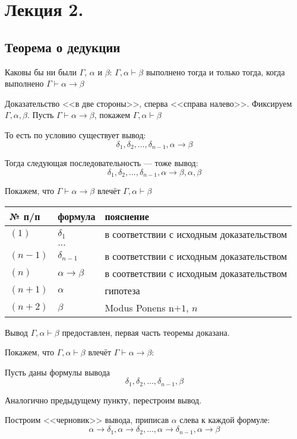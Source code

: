\section{Лекция 2.}

\subsection{Теорема о дедукции}
Каковы бы ни были $\Gamma$, $\alpha$ и $\beta$:
$\Gamma,\alpha\vdash\beta$ выполнено тогда и только тогда, когда выполнено $\Gamma\vdash\alpha\rightarrow\beta$


Доказательство <<в две стороны>>, сперва <<справа налево>>.
Фиксируем $\Gamma,\alpha,\beta$.
Пусть $\Gamma\vdash\alpha\rightarrow\beta$, покажем $\Gamma,\alpha\vdash\beta$

То есть по условию существует вывод: $$\delta_1, \delta_2, \dots, \delta_{n-1}, \alpha\rightarrow\beta$$

Тогда следующая последовательность --- тоже вывод: 
$$\delta_1, \delta_2, \dots, \delta_{n-1}, \alpha\rightarrow\beta, \alpha, \beta$$


Покажем, что $\Gamma\vdash\alpha\rightarrow\beta$ влечёт $\Gamma,\alpha\vdash\beta$

\begin{tabular}{lll}
№ п/п & формула & пояснение\\
\hline
$(1)$ & $\delta_1$ & в соответствии с исходным доказательством\\
    & $\dots$ \\
$(n-1)$ & $\delta_{n-1}$ & в соответствии с исходным доказательством\\
$(n)$ & $\alpha\rightarrow\beta $ & в соответствии с исходным доказательством\\
$(n+1)$ & $\alpha$ & гипотеза\\
$(n+2)$ & $\beta$ & Modus Ponens n$+1$, $n$
\end{tabular}

Вывод $\Gamma,\alpha\vdash\beta$ предоставлен, первая часть теоремы доказана.

Покажем, что $\Gamma,\alpha\vdash\beta$ влечёт $\Gamma\vdash\alpha\rightarrow\beta$:

Пусть даны формулы вывода $$\delta_1,\delta_2,\dots,\delta_{n-1},\beta$$

Аналогично предыдущему пункту, перестроим вывод.

Построим <<черновик>> вывода, приписав $\alpha$ слева к каждой формуле:
$$\alpha\rightarrow\delta_1,\alpha\rightarrow\delta_2,\dots,\alpha\rightarrow\delta_{n-1},\alpha\rightarrow\beta$$

